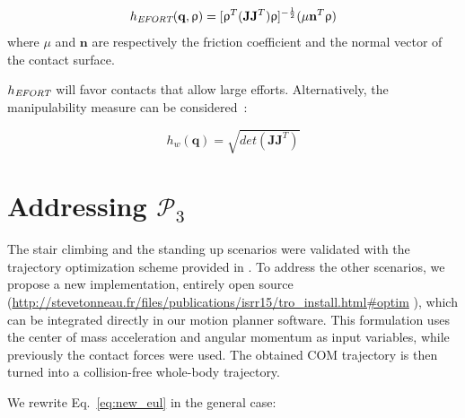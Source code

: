 \documentclass[journal]{IEEEtran}
\newcommand{\mat}[1]{\ensuremath{\begin{bmatrix}#1\end{bmatrix}}}	%
\begin{document}
\begin{equation}
h_{\textrm{\it EFORT}}(\mathbf{q}, \uprho) = [\uprho^{T}(\mathbf{J}\mathbf{J}^T)\uprho]^{-\frac{1}{2}} ( \mu \mathbf{n}^T \uprho)
\end{equation}
where $\mu$ and $\mathbf{n}$ are respectively the friction coefficient and the normal vector of the contact surface.

$h_{\textrm{\it EFORT}}$ will favor contacts that allow large efforts. Alternatively, the manipulability measure can be considered~\cite{Yoshikawa1984}:

\begin{equation} \label{ellipsoid}
h_{w}(\mathbf{q}) = \sqrt{det(\mathbf{J}\mathbf{J}^T)}
\end{equation}



\section{Addressing $\mathcal{P}_3$}
\label{app:optim}
The stair climbing and the standing up scenarios were validated with the trajectory optimization scheme provided in \citeauthor{Carpentier2016}. 
To address the other scenarios, we propose a new implementation, entirely open source (\url{http://stevetonneau.fr/files/publications/isrr15/tro_install.html\#optim} ), which can be integrated directly in our motion planner software. This formulation uses the center of mass acceleration and angular momentum as input variables, while previously the contact forces were used.
The obtained COM trajectory is then turned into a collision-free whole-body trajectory.

We rewrite Eq.~\ref{eq:new_eul} in the general case:

\end{document}
